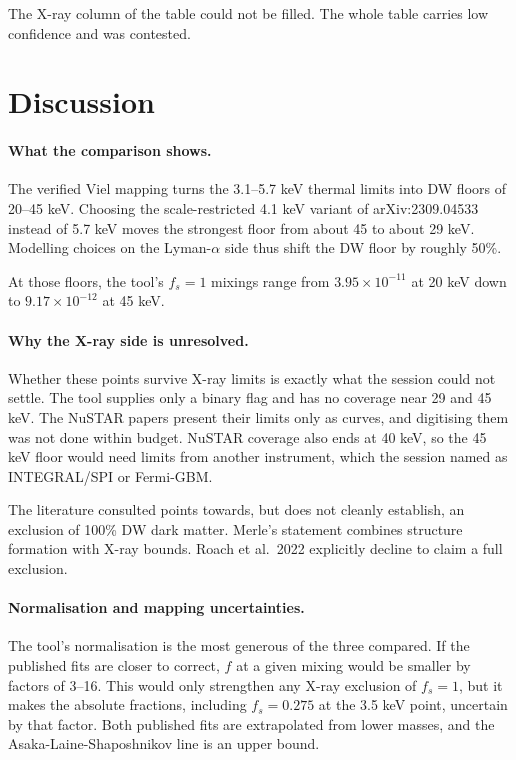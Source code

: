 \documentclass[11pt,a4paper]{article}
\begin{document}
The X-ray column of the table could not be filled. The whole table carries low confidence and was contested.

\section{Discussion}
\paragraph{What the comparison shows.}
The verified Viel mapping turns the 3.1--5.7 keV thermal limits into DW floors of 20--45 keV. Choosing the scale-restricted 4.1 keV variant of arXiv:2309.04533 instead of 5.7 keV moves the strongest floor from about 45 to about 29 keV. Modelling choices on the Lyman-$\alpha$ side thus shift the DW floor by roughly 50\%.

At those floors, the tool's $f_s=1$ mixings range from $3.95\times10^{-11}$ at 20 keV down to $9.17\times10^{-12}$ at 45 keV.

\paragraph{Why the X-ray side is unresolved.}
Whether these points survive X-ray limits is exactly what the session could not settle. The tool supplies only a binary flag and has no coverage near 29 and 45 keV. The NuSTAR papers present their limits only as curves, and digitising them was not done within budget. NuSTAR coverage also ends at 40 keV, so the 45 keV floor would need limits from another instrument, which the session named as INTEGRAL/SPI or Fermi-GBM.

The literature consulted points towards, but does not cleanly establish, an exclusion of 100\% DW dark matter. Merle's statement combines structure formation with X-ray bounds. Roach et al.\ 2022 explicitly decline to claim a full exclusion.

\paragraph{Normalisation and mapping uncertainties.}
The tool's normalisation is the most generous of the three compared. If the published fits are closer to correct, $f$ at a given mixing would be smaller by factors of 3--16. This would only strengthen any X-ray exclusion of $f_s=1$, but it makes the absolute fractions, including $f_s=0.275$ at the 3.5 keV point, uncertain by that factor. Both published fits are extrapolated from lower masses, and the Asaka-Laine-Shaposhnikov line is an upper bound.
\end{document}
